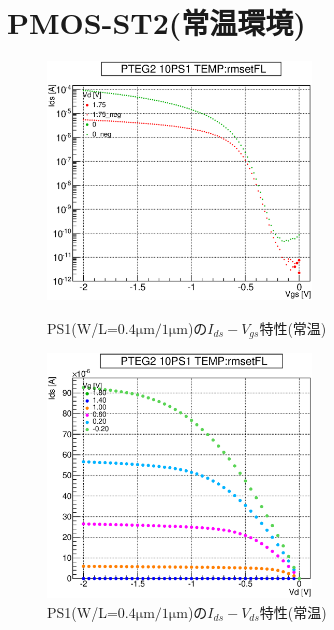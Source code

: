 		\section{PMOS-ST2(常温環境)}
				\begin{figure}[htbp]
					\begin{minipage}{0.5\hsize}
						\begin{center}
							\includegraphics[width=70mm]{./Chapter/Appendix/Picture/PST/PS1/PTEG2_10_PS1_IdVg_rmsetFL.eps}
						\end{center}
						\caption{PS1(W/L=$0.4\mathrm{\mu m}/1\mathrm{\mu m}$)の$I_{ds}-V_{gs}$特性(常温)}
						\label{fig:PS1_IdVg_room}
					\end{minipage}
					\begin{minipage}{0.5\hsize}
						\begin{center}
							\includegraphics[width=70mm]{./Chapter/Appendix/Picture/PST/PS1/PTEG2_10_PS1_IdVd_rmsetFL.eps}
						\end{center}
						\caption{PS1(W/L=$0.4\mathrm{\mu m}/1\mathrm{\mu m}$)の$I_{ds}-V_{ds}$特性(常温)}
						\label{fig:PS1_IdVd_room}
					\end{minipage}
				\end{figure}
